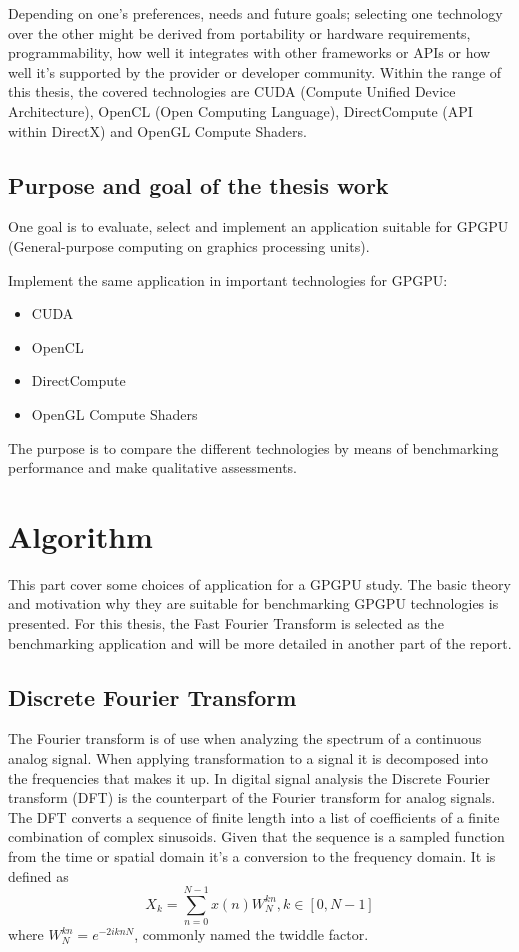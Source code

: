 Depending on one's preferences, needs and future goals; selecting one technology over the other might be derived from portability or hardware requirements, programmability, how well it integrates with other frameworks or APIs or how well it's supported by the provider or developer community. Within the range of this thesis, the covered technologies are CUDA (Compute Unified Device Architecture), OpenCL (Open Computing Language), DirectCompute (API within DirectX) and OpenGL Compute Shaders.

\subsection{Purpose and goal of the thesis work}
One goal is to evaluate, select and implement an application suitable for GPGPU (General-purpose computing on graphics processing units).

Implement the same application in important technologies for GPGPU:
\begin{itemize}
	\item CUDA
	\item OpenCL
	\item DirectCompute
	\item OpenGL Compute Shaders
\end{itemize}

The purpose is to compare the different technologies by means of benchmarking performance and make qualitative assessments.

\section{Algorithm}
This part cover some choices of application for a GPGPU study. The basic theory and motivation why they are suitable for benchmarking GPGPU technologies is presented. For this thesis, the Fast Fourier Transform is selected as the benchmarking application and will be more detailed in another part of the report.

\newtheorem{thm}{Theorem}[chapter] %
\theoremstyle{definition}
\newtheorem{defn}[thm]{Definition} 

\subsection{Discrete Fourier Transform}
The Fourier transform is of use when analyzing the spectrum of a continuous analog signal. When applying transformation to a signal it is decomposed into the frequencies that makes it up. In digital signal analysis the Discrete Fourier transform (DFT) is the counterpart of the Fourier transform for analog signals. The DFT converts a sequence of finite length into a list of coefficients of a finite combination of complex sinusoids. Given that the sequence is a sampled function from the time or spatial domain it's a conversion to the frequency domain. It is defined as
\begin{equation}
	X_k=\sum_{n=0}^{N-1}x(n)W_N^{kn}, k \in {[0, N-1]}	
\end{equation}
	where $W_N^{kn}=e^{-2iknN}$, commonly named the twiddle factor\cite{Gentleman1966}.

